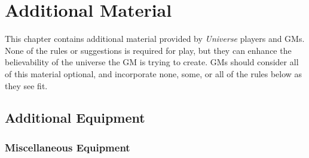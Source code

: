 \chapter{Additional Material}
\label{sec:additional-material}

This chapter contains additional material provided by \emph{Universe}
players and GMs.  None of the rules or suggestions is required for
play, but they can enhance the believability of the universe the GM is
trying to create.  GMs should consider all of this material optional,
and incorporate none, some, or all of the rules below as they see fit.




\section{Additional Equipment}
\label{sec:additional-equipment}


\subsection{Miscellaneous Equipment}
\label{sec:misc-equipm}

